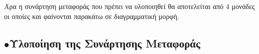 \documentclass{article}
\begin{document}
{\begin{center}
\begin{changemargin}{-1.6cm}{0.5cm}
\begin{tabular}{|c|c|c|c|}
        \end{tabular}
        \end{changemargin}
\end{center}
Άρα η συνάρτηση μεταφοράς που πρέπει να υλοποιηθεί θα αποτελείται από 4 μονάδες οι οποίες και φαίνονται παρακάτω σε διαγραμματική μορφή. \\
\begin{center}
\begin{changemargin}{-2.6cm}{0.5cm} 
\raisebox{-6ex}{$\to$}%
%
\raisebox{-6ex}{$\to$}%
%
\raisebox{-6ex}{$\to$}%
%
\raisebox{-6ex}{$\to$}%
%
\raisebox{-6ex}{$\to$}%
 \end{changemargin}
\end{center} 
\newpage
 \subsection*{$\bullet$Υλοποίηση της Συνάρτησης Μεταφοράς}
 
}
\end{document}
